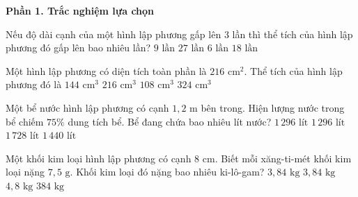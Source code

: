 \textbf{Phần 1. Trắc nghiệm lựa chọn}

\begin{ex} %
Nếu độ dài cạnh của một hình lập phương gấp lên $3$ lần thì thể tích của hình lập phương đó gấp lên bao nhiêu lần?
\choice
{$9\text{ lần}$}
{\True $27\text{ lần}$}
{$6\text{ lần}$}
{$18\text{ lần}$}
\end{ex}

\begin{ex} %
Một hình lập phương có diện tích toàn phần là $216\text{ cm}^2$. Thể tích của hình lập phương đó là
\choice
{$144\text{ cm}^3$}
{\True $216\text{ cm}^3$}
{$108\text{ cm}^3$}
{$324\text{ cm}^3$}
\end{ex}

\begin{ex} %
Một bể nước hình lập phương có cạnh $1{,}2\text{ m}$ bên trong. Hiện lượng nước trong bể chiếm $75\%$ dung tích bể. Bể đang chứa bao nhiêu lít nước?
\choice
{$1\,296\text{ lít}$}
{\True $1\,296\text{ lít}$}
{$1\,728\text{ lít}$}
{$1\,440\text{ lít}$}
\end{ex}

\begin{ex} %
Một khối kim loại hình lập phương có cạnh $8\text{ cm}$. Biết mỗi xăng-ti-mét khối kim loại nặng $7{,}5\text{ g}$. Khối kim loại đó nặng bao nhiêu ki-lô-gam?
\choice
{$3{,}84\text{ kg}$}
{\True $3{,}84\text{ kg}$}
{$4{,}8\text{ kg}$}
{$384\text{ kg}$}
\end{ex}

